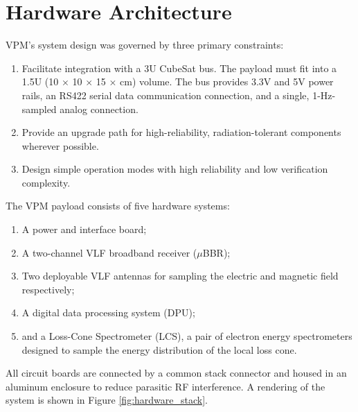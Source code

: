 \section{Hardware Architecture}
VPM's system design was governed by three primary constraints:
\begin{enumerate}
\item Facilitate integration with a 3U CubeSat bus. The payload must fit into a 1.5U (10 $\times$ 10 $\times$ 15 $\times$ cm) volume. The bus provides 3.3V and 5V power rails, an RS422 serial data communication connection, and a single, 1-Hz-sampled analog connection.
\item Provide an upgrade path for high-reliability, radiation-tolerant components wherever possible.
\item Design simple operation modes with high reliability and low verification complexity. 
\end{enumerate}

\noindent The VPM payload consists of five hardware systems:
\begin{enumerate}
\item A power and interface board;
\item A two-channel VLF broadband receiver ($\mu$BBR);
\item Two deployable VLF antennas for sampling the electric and magnetic field respectively;
\item A digital data processing system (DPU);
\item and a Loss-Cone Spectrometer (LCS), a pair of electron energy spectrometers designed to sample the energy distribution of the local loss cone. 
\end{enumerate}
All circuit boards are connected by a common stack connector and housed in an aluminum enclosure to reduce parasitic RF interference. A rendering of the system is shown in Figure \ref{fig:hardware_stack}.

